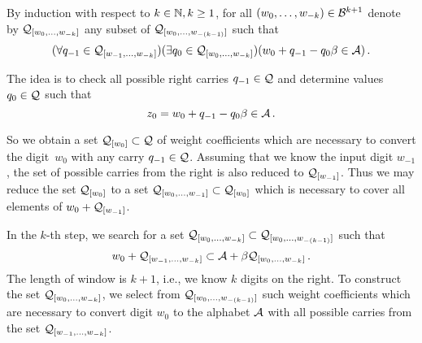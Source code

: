         By induction with respect to $k \in \mathbb{N}, k\geq 1$, for all $(w_{0}, \dots, w_{-k})\in \mathcal{B}^{k+1}$ denote by $\mathcal{Q}_{[w_{0}, \dots, w_{-k}]}$ any subset of  $\mathcal{Q}_{[w_{0}, \dots, w_{-(k-1)}]}$ such that 
        $$
           (\forall q_{-1} \in \mathcal{Q}_{[w_{-1}, \dots, w_{-k}]})(\exists q_0 \in \mathcal{Q}_{[w_{0}, \dots, w_{-k}]})(w_0 + q_{-1} - q_0 \beta \in \mathcal{A})\,.
        $$
        
    
 
    The idea is to check all possible right carries $q_{-1}\in\mathcal{Q}$ and determine values $q_0\in\mathcal{Q}$ such that 
    $$
    z_0=w_0 + q_{-1} - q_0 \beta \in \mathcal{A} \,.
    $$  
    
    So we obtain a set $\mathcal{Q}_{[w_0]}\subset\mathcal{Q}$ of weight coefficients which are necessary to convert the digit~$w_0$ with any carry $q_{-1}\in\mathcal{Q}$. Assuming that we know the input digit $w_{-1}$, the set of possible carries from the right is also reduced to $\mathcal{Q}_{[w_{-1}]}$. Thus we may reduce the set $\mathcal{Q}_{[w_0]}$ to a set $\mathcal{Q}_{[w_{0}, \dots, w_{-1}]}\subset \mathcal{Q}_{[w_0]}$ which is necessary to cover all elements of $w_0 + \mathcal{Q}_{[w_{-1}]}$. 

In the $k$-th step, we search for a set $\mathcal{Q}_{[w_{0}, \dots, w_{-k}]}\subset\mathcal{Q}_{[w_{0}, \dots, w_{-(k-1)}]}$ such that 
               $$
              w_0 + \mathcal{Q}_{[w_{-1}, \dots, w_{-k}]} \subset \mathcal{A} + \beta \mathcal{Q}_{[w_{0}, \dots, w_{-k}]}\,.
              $$
              The length of window is $k+1$, i.e., we know $k$ digits on the right. To  construct the set $\mathcal{Q}_{[w_{0}, \dots, w_{-k}]}$, we select from $\mathcal{Q}_{[w_{0}, \dots, w_{-(k-1)}]}$ such weight coefficients which are necessary to convert digit $w_0$ to the alphabet $\mathcal{A}$ with all possible carries from the set $\mathcal{Q}_{[w_{-1}, \dots, w_{-k}]}$.
                 
